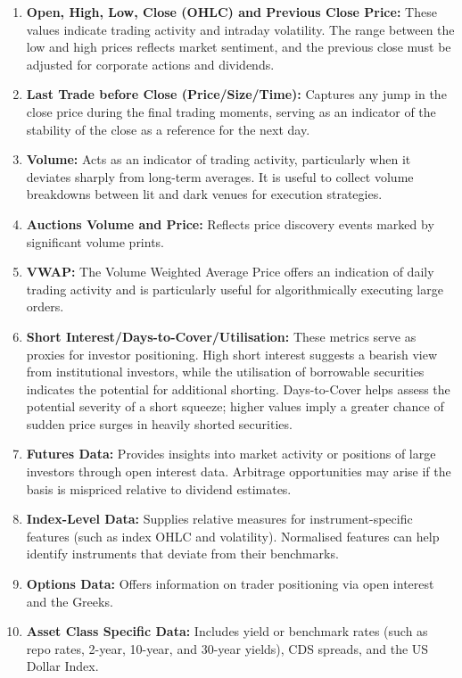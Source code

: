 \begin{definition} 
\begin{enumerate}[label=\roman*.]
\setlength{\itemsep}{0pt}
\item \textbf{Open, High, Low, Close (OHLC) and Previous Close Price:} These values indicate trading activity and intraday volatility. The range between the low and high prices reflects market sentiment, and the previous close must be adjusted for corporate actions and dividends.
\item \textbf{Last Trade before Close (Price/Size/Time):} Captures any jump in the close price during the final trading moments, serving as an indicator of the stability of the close as a reference for the next day.
\item \textbf{Volume:} Acts as an indicator of trading activity, particularly when it deviates sharply from long-term averages. It is useful to collect volume breakdowns between lit and dark venues for execution strategies.
\item \textbf{Auctions Volume and Price:} Reflects price discovery events marked by significant volume prints.
\item \textbf{VWAP:} The Volume Weighted Average Price offers an indication of daily trading activity and is particularly useful for algorithmically executing large orders.
\item \textbf{Short Interest/Days-to-Cover/Utilisation:} These metrics serve as proxies for investor positioning. High short interest suggests a bearish view from institutional investors, while the utilisation of borrowable securities indicates the potential for additional shorting. Days-to-Cover helps assess the potential severity of a short squeeze; higher values imply a greater chance of sudden price surges in heavily shorted securities.
\item \textbf{Futures Data:} Provides insights into market activity or positions of large investors through open interest data. Arbitrage opportunities may arise if the basis is mispriced relative to dividend estimates.
\item \textbf{Index-Level Data:} Supplies relative measures for instrument-specific features (such as index OHLC and volatility). Normalised features can help identify instruments that deviate from their benchmarks.
\item \textbf{Options Data:} Offers information on trader positioning via open interest and the Greeks.
\item \textbf{Asset Class Specific Data:} Includes yield or benchmark rates (such as repo rates, 2-year, 10-year, and 30-year yields), CDS spreads, and the US Dollar Index.
\end{enumerate}
\end{definition}

